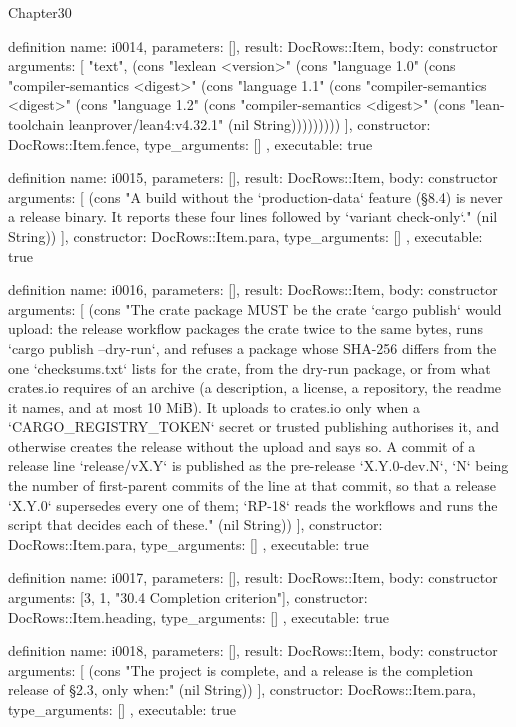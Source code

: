 \begin{lexlean}{Chapter30}
\begin{semanticmodule}
definition{
  name: i0014,
  parameters: [],
  result: DocRows::Item,
  body: constructor{
    arguments: [
      "text",
      (cons "lexlean <version>" (cons "language 1.0" (cons "compiler-semantics <digest>" (cons "language 1.1" (cons "compiler-semantics <digest>" (cons "language 1.2" (cons "compiler-semantics <digest>" (cons "lean-toolchain leanprover/lean4:v4.32.1" (nil String)))))))))
    ],
    constructor: DocRows::Item.fence,
    type_arguments: []
  },
  executable: true
}

definition{
  name: i0015,
  parameters: [],
  result: DocRows::Item,
  body: constructor{
    arguments: [
      (cons "A build without the `production-data` feature (§8.4) is never a release binary. It reports these four lines followed by `variant check-only`." (nil String))
    ],
    constructor: DocRows::Item.para,
    type_arguments: []
  },
  executable: true
}

definition{
  name: i0016,
  parameters: [],
  result: DocRows::Item,
  body: constructor{
    arguments: [
      (cons "The crate package MUST be the crate `cargo publish` would upload: the release workflow packages the crate twice to the same bytes, runs `cargo publish --dry-run`, and refuses a package whose SHA-256 differs from the one `checksums.txt` lists for the crate, from the dry-run package, or from what crates.io requires of an archive (a description, a license, a repository, the readme it names, and at most 10 MiB). It uploads to crates.io only when a `CARGO_REGISTRY_TOKEN` secret or trusted publishing authorises it, and otherwise creates the release without the upload and says so. A commit of a release line `release/vX.Y` is published as the pre-release `X.Y.0-dev.N`, `N` being the number of first-parent commits of the line at that commit, so that a release `X.Y.0` supersedes every one of them; `RP-18` reads the workflows and runs the script that decides each of these." (nil String))
    ],
    constructor: DocRows::Item.para,
    type_arguments: []
  },
  executable: true
}

definition{
  name: i0017,
  parameters: [],
  result: DocRows::Item,
  body: constructor{
    arguments: [3, 1, "30.4 Completion criterion"],
    constructor: DocRows::Item.heading,
    type_arguments: []
  },
  executable: true
}

definition{
  name: i0018,
  parameters: [],
  result: DocRows::Item,
  body: constructor{
    arguments: [
      (cons "The project is complete, and a release is the completion release of §2.3, only when:" (nil String))
    ],
    constructor: DocRows::Item.para,
    type_arguments: []
  },
  executable: true
}


\end{semanticmodule}
\end{lexlean}
